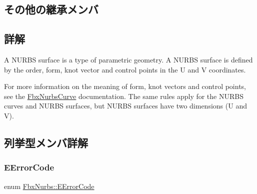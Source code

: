 \subsection*{その他の継承メンバ}


\subsection{詳解}
A N\+U\+R\+BS surface is a type of parametric geometry. A N\+U\+R\+BS surface is defined by the order, form, knot vector and control points in the U and V coordinates.

For more information on the meaning of form, knot vectors and control points, see the \hyperlink{class_fbx_nurbs_curve}{Fbx\+Nurbs\+Curve} documentation. The same rules apply for the N\+U\+R\+BS curves and N\+U\+R\+BS surfaces, but N\+U\+R\+BS surfaces have two dimensions (U and V). 

\subsection{列挙型メンバ詳解}
\mbox{\label{class_fbx_nurbs_a1ff85864ee6533b4b6d43537ec625a66}} 
\subsubsection{\texorpdfstring{E\+Error\+Code}{EErrorCode}}
{\footnotesize\ttfamily enum \hyperlink{class_fbx_nurbs_a1ff85864ee6533b4b6d43537ec625a66}{Fbx\+Nurbs\+::\+E\+Error\+Code}}

